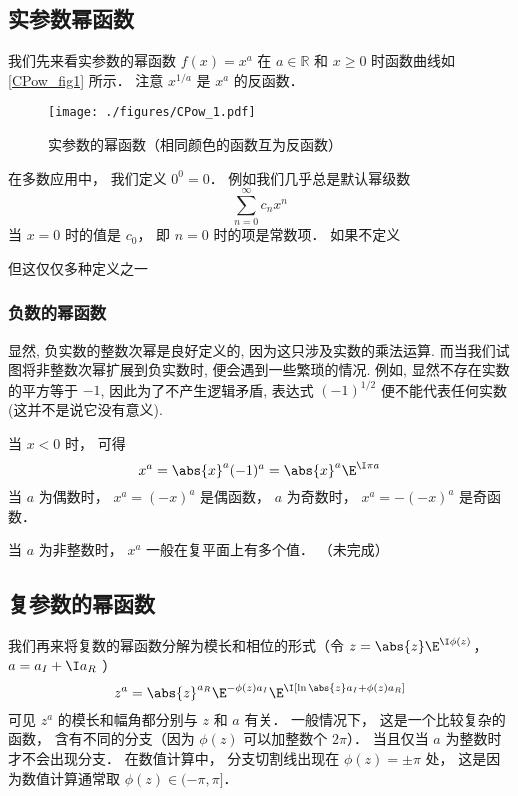 

\subsection{实参数幂函数}
我们先来看实参数的幂函数 $f(x) = x^a$ 在 $a\in\mathbb R$ 和 $x \geqslant 0$ 时函数曲线如\autoref{CPow_fig1} 所示． 注意 $x^{1/a}$ 是 $x^a$ 的反函数．
\begin{figure}[ht]
\centering
\texttt{[image: ./figures/CPow\_1.pdf]}
\caption{实参数的幂函数（相同颜色的函数互为反函数）} \label{CPow_fig1}
\end{figure}

在多数应用中， 我们定义 $0^0 = 0$． 例如我们几乎总是默认幂级数
\begin{equation}
\sum_{n=0}^\infty c_n x^n
\end{equation}
当 $x = 0$ 时的值是 $c_0$， 即 $n=0$ 时的项是常数项． 如果不定义

但这仅仅多种定义之一

\subsubsection{负数的幂函数}
显然, 负实数的整数次幂是良好定义的, 因为这只涉及实数的乘法运算. 而当我们试图将非整数次幂扩展到负实数时, 便会遇到一些繁琐的情况. 例如, 显然不存在实数的平方等于 $-1$, 因此为了不产生逻辑矛盾, 表达式 $(-1)^{1/2}$ 便不能代表任何实数 (这并不是说它没有意义). 


当 $x < 0$ 时， 可得
\begin{equation}
x^a = \abs{x}^a (-1)^a = \abs{x}^a\E^{\I\pi a}
\end{equation}
当 $a$ 为偶数时， $x^a = (-x)^a$ 是偶函数， $a$ 为奇数时， $x^a = -(-x)^a$ 是奇函数． 

当 $a$ 为非整数时， $x^a$ 一般在复平面上有多个值． （未完成）

\subsection{复参数的幂函数}
我们再来将复数的幂函数分解为模长和相位的形式（令 $z = \abs{z} \E^{\I\phi(z)}$， $a = a_I + \I a_R$ ）
\begin{equation}
z^a = \abs{z}^{a_R} \E^{-\phi(z) a_I} \E^{\I[\ln\abs{z}a_I + \phi(z)a_R]}
\end{equation}
可见 $z^a$ 的模长和幅角都分别与 $z$ 和 $a$ 有关． 一般情况下， 这是一个比较复杂的函数， 含有不同的分支（因为 $\phi(z)$ 可以加整数个 $2\pi$）．%
当且仅当 $a$ 为整数时才不会出现分支． 在数值计算中， 分支切割线出现在 $\phi(z) = \pm\pi$ 处， 这是因为数值计算通常取 $\phi(z)\in(-\pi, \pi]$．
